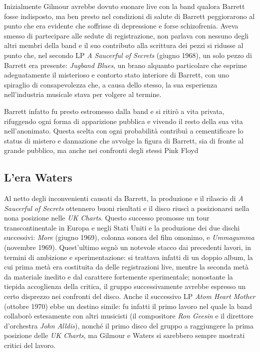 \documentclass[class=book, crop=false, oneside, 12pt]{standalone}
\begin{document}
    Inizialmente Gilmour avrebbe dovuto suonare live con la band qualora Barrett fosse indisposto, ma ben presto nel condizioni di salute di Barrett peggiorarono al punto che era evidente che soffrisse di depressione e forse schizofrenia. Aveva smesso di partecipare alle sedute di registrazione, non parlava con nessuno degli altri membri della band e il suo contributo alla scrittura dei pezzi si ridusse al punto che, nel secondo LP \emph{A Saucerful of Secrets} (giugno 1968), un solo pezzo di Barrett era presente: \emph{Jugband Blues}, un brano alquanto particolare che esprime adeguatamente il misterioso e contorto stato interiore di Barrett, con uno spiraglio di consapevolezza che, a causa dello stesso, la sua esperienza nell'industria musicale stava per volgere al termine.

    Barrett infatto fu presto estromesso dalla band e si ritirò a vita privata, rifuggendo ogni forma di apparizione pubblica e vivendo il resto della sua vita nell'anonimato. Questa scelta con ogni probabilità contribuì a cementificare lo status di mistero e dannazione che avvolge la figura di Barrett, sia di fronte al grande pubblico, ma anche nei confronti degli stessi Pink Floyd

    \subsection{L'era Waters}
    Al netto degli inconvenienti causati da Barrett, la produzione e il rilascio di \emph{A Saucerful of Secrets} ottennero buoni risultati e il disco riuscì a posizionarsi nella nona posizione nelle \emph{UK Charts}. Questo successo promosse un tour transcontinentale in Europa e negli Stati Uniti e la produzione dei due dischi successivi: \emph{More} (giugno 1969), colonna sonora del film omonimo, e \emph{Ummagumma} (novembre 1969). Quest'ultimo segnò un notevole stacco dai precedenti lavori, in termini di ambizione e sperimentazione: si trattava infatti di un doppio album, la cui prima metà era costituita da delle registrazioni live, mentre la seconda metà da materiale inedito e dal carattere fortemente sperimentale; nonostante la tiepida accoglienza della critica, il gruppo successivamente avrebbe espresso un certo disprezzo nei confronti del disco. Anche il successivo LP  \emph{Atom Heart Mother} (ottobre 1970) ebbe un destino simile: fu infatti il primo lavoro nel quale la band collaborò estesamente con altri musicisti (il compositore \emph{Ron Geesin} e il direttore d'orchestra \emph{John Alldis}), nonché il primo disco del gruppo a raggiungere la prima posizione delle \emph{UK Charts}, ma Gilmour e Waters si sarebbero sempre mostrati critici del lavoro.
\end{document}
